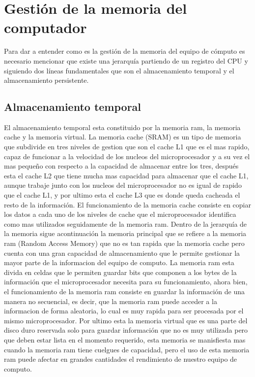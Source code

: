 \documentclass{article}
\begin{document}
\section{Gestión de la memoria del computador}
 Para dar a entender como es la gestión de la memoria del equipo de cómputo es necesario mencionar que existe una jerarquía partiendo de un registro del CPU y siguiendo dos líneas fundamentales que son el almacenamiento temporal y el almacenamiento persistente.
\subsection{Almacenamiento temporal}
El almacenamiento temporal esta constituido por la memoria ram, la memoria cache y la memoria virtual. La memoria cache (SRAM) es un tipo de memoria que subdivide en tres niveles de gestion que son el cache L1 que es el mas rapido, capaz de funcionar a la velocidad de los nucleos del microprocesador y a su vez el mas pequeño con respecto a la capacidad de almacenar entre los tres, después esta el cache L2 que tiene mucha mas capacidad para almacenar que el cache L1, aunque trabaje junto con los nucleos del microprocesador no es igual de rapido que el cache L1, y por ultimo esta el cache L3 que es donde queda cacheada el resto de la información. El funcionamiento de la memoria cache consiste en copiar los datos a cada uno de los niveles de cache que el microprocesador identifica como mas utilizados seguidamente de la memoria ram. Dentro de la jerarquía de la memoria sigue acontinuación la memoria principal que se refiere a la memoria ram (Random Access Memory) que no es tan rapida que la memoria cache pero cuenta con una gran capacidad de almacenamiento que le permite gestionar la mayor parte de la informacion del equipo de computo. La memoria ram esta divida en celdas que le permiten guardar bits que componen a los bytes de la información que el microprocesador necesita para su funcionamiento, ahora bien, el funcionamiento de la memoria ram consiste en guardar la información de una manera no secuencial, es decir, que la memoria ram puede acceder a la informacion de forma aleatoria, lo cual es muy rapida para ser procesada por el mismo microprocesador. Por ultimo esta la memoria virtual que es una parte del disco duro  reservada solo para guardar información que no es muy utilizada pero que deben estar lista en el momento requerido, esta memoria se manisfiesta mas cuando la memoria ram tiene cuelgues de capacidad, pero el uso de esta memoria ram puede afectar en grandes cantidades el rendimiento de nuestro equipo de computo. \cite{memorypc}
\end{document}
